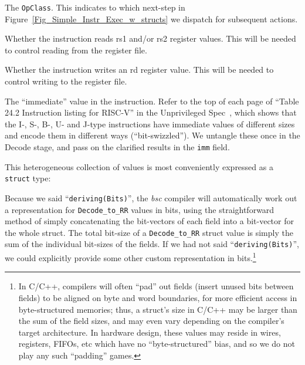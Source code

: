 \begin{itemize}
  \begin{tightlist}

    \item The \verb|OpClass|.  This indicates to which next-step in
      Figure~\ref{Fig_Simple_Instr_Exec_w_structs} we dispatch for
      subsequent actions.

    \item Whether the instruction reads rs1 and/or rs2 register
      values.  This will be needed to control reading from the
      register file.

    \item Whether the instruction writes an rd register value.  This
      will be needed to control writing to the register file.

    \item The ``immediate'' value in the instruction. Refer to the top
        of each page of ``Table 24.2 Instruction listing for RISC-V''
        in the Unprivileged Spec~\cite{RISCV_Unpriv_2019_12_13}, which
        shows that the I-, S-, B-, U- and J-type instructions have
        immediate values of different sizes and encode them in
        different ways (``bit-swizzled'').  We untangle these once in
        the Decode stage, and pass on the clarified results in the
        \verb|imm| field.
  \end{tightlist}

\end{itemize}

This heterogeneous collection of values is most conveniently expressed
as a \verb|struct| type:

\label{Sec_struct_D_to_RR}





Because we said ``\verb|deriving(Bits)|'', the \emph{bsc} compiler
will automatically work out a representation for \verb|Decode_to_RR|
values in bits, using the straightforward method of simply
concatenating the bit-vectors of each field into a bit-vector for the
whole struct.  The total bit-size of a \verb|Decode_to_RR| struct
value is simply the sum of the individual bit-sizes of the fields.  If
we had not said ``\verb|deriving(Bits)|'', we could explicitly provide
some other custom representation in bits.\footnote{ In C/C++,
compilers will often ``pad'' out fields (insert unused bits between
fields) to be aligned on byte and word boundaries, for more efficient
access in byte-structured memories; thus, a struct's size in C/C++ may
be larger than the sum of the field sizes, and may even vary depending
on the compiler's target architecture.  In hardware design, these
values may reside in wires, registers, FIFOs, etc which have no
``byte-structured'' bias, and so we do not play any such ``padding''
games.}

